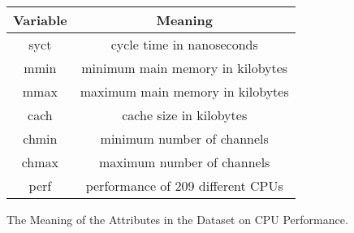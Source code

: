 \documentclass[12pt]{article}
\begin{document}
\begin{enumerate}
\begin{enumerate}
\end{enumerate}

\begin{figure}[h]

  \centering

  \begin{tabular}{c | c}

    {\bf Variable} & {\bf Meaning} \\ \hline

    syct & cycle time in nanoseconds \\ \hline

    mmin & minimum main memory in kilobytes \\ \hline

    mmax & maximum main memory in kilobytes \\ \hline

    cach & cache size in kilobytes \\ \hline

    chmin & minimum number of channels \\ \hline

    chmax & maximum number of channels \\ \hline

    perf & performance of 209 different CPUs

  \end{tabular} 
  \caption{The Meaning of the Attributes in the Dataset on CPU Performance.}
  \label{fig:meaning}

\end{figure}


\end{enumerate}
\end{document}

